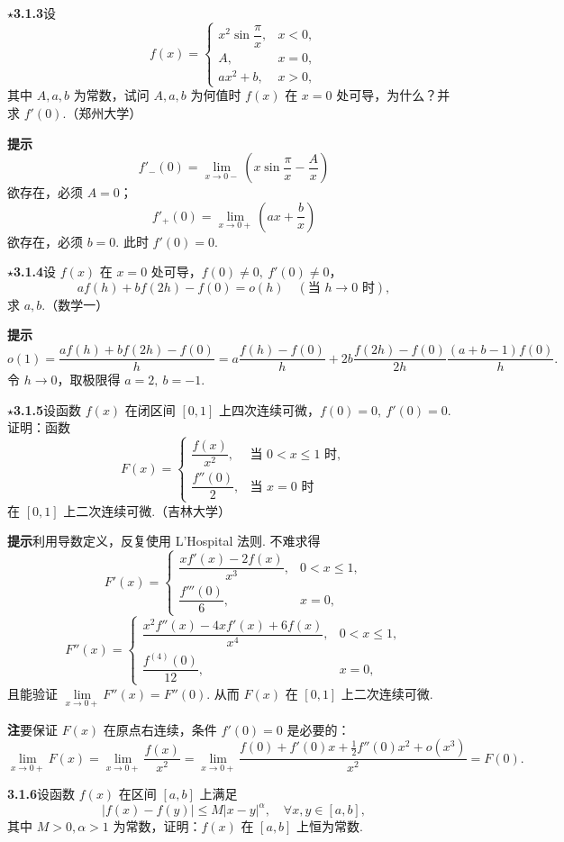 \documentclass[UTF8,12pt,a4paper,fontset=fandol]{ctexart}
\begin{document}
\noindent\textbf{$\star$3.1.3}\quad 设
\[
f(x)=
\begin{cases}
x^2\sin\dfrac\pi x, & x<0,\\
A, & x=0,\\
ax^2+b, & x>0,
\end{cases}
\]
其中 $A,a,b$ 为常数，试问 $A,a,b$ 为何值时 $f(x)$ 在 $x=0$ 处可导，为什么？并求 $f'(0)$.（郑州大学）

\noindent\textbf{提示}\quad
\[
  f'_-(0)=\lim_{x\to0-}\left(x\sin\frac\pi x-\frac Ax\right)
\]
欲存在，必须 $A=0$；
\[
  f'_+(0)=\lim_{x\to0+}\left(ax+\frac bx\right)
\]
欲存在，必须 $b=0$. 此时 $f'(0)=0$.

\noindent\textbf{$\star$3.1.4}\quad 设 $f(x)$ 在 $x=0$ 处可导，$f(0)\ne0,\ f'(0)\ne0$，
\[
  af(h)+bf(2h)-f(0)=o(h)\quad(\text{当 }h\to0\text{ 时}),
\]
求 $a,b$.（数学一）

\noindent\textbf{提示}\quad
\[
o(1)=\frac{af(h)+bf(2h)-f(0)}h
=a\frac{f(h)-f(0)}h+2b\frac{f(2h)-f(0)}{2h}
\frac{(a+b-1)f(0)}h.
\]
令 $h\to0$，取极限得 $a=2,\ b=-1$.

\noindent\textbf{$\star$3.1.5}\quad 设函数 $f(x)$ 在闭区间 $[0,1]$ 上四次连续可微，$f(0)=0,\ f'(0)=0$. 证明：函数
\[
F(x)=
\begin{cases}
\dfrac{f(x)}{x^2}, & \text{当 }0<x\le1\text{ 时},\\
\dfrac{f''(0)}2, & \text{当 }x=0\text{ 时}
\end{cases}
\]
在 $[0,1]$ 上二次连续可微.（吉林大学）

\noindent\textbf{提示}\quad 利用导数定义，反复使用 L'Hospital 法则. 不难求得
\[
F'(x)=
\begin{cases}
\dfrac{xf'(x)-2f(x)}{x^3}, & 0<x\le1,\\
\dfrac{f'''(0)}6, & x=0,
\end{cases}
\]
\[
F''(x)=
\begin{cases}
\dfrac{x^2f''(x)-4xf'(x)+6f(x)}{x^4}, & 0<x\le1,\\
\dfrac{f^{(4)}(0)}{12}, & x=0,
\end{cases}
\]
且能验证 $\lim\limits_{x\to0+}F''(x)=F''(0)$. 从而 $F(x)$ 在 $[0,1]$ 上二次连续可微.

\noindent\textbf{注}\quad 要保证 $F(x)$ 在原点右连续，条件 $f'(0)=0$ 是必要的：
\[
  \lim_{x\to0+}F(x)=\lim_{x\to0+}\frac{f(x)}{x^2}
  =\lim_{x\to0+}\frac{f(0)+f'(0)x+\frac12f''(0)x^2+o(x^3)}{x^2}=F(0).
\]

\noindent\textbf{3.1.6}\quad 设函数 $f(x)$ 在区间 $[a,b]$ 上满足
\[
  |f(x)-f(y)|\le M|x-y|^\alpha,\quad \forall x,y\in[a,b],
\]
其中 $M>0,\alpha>1$ 为常数，证明：$f(x)$ 在 $[a,b]$ 上恒为常数.
\end{document}
